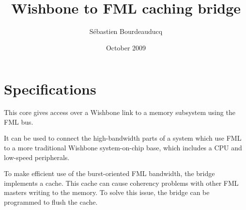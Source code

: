 \documentclass[a4paper,11pt]{article}
\title{Wishbone to FML caching bridge}
\author{S\'ebastien Bourdeauducq}
\date{October 2009}
\begin{document}
\setlength{\parindent}{0pt}
\setlength{\parskip}{5pt}
\maketitle{}
\section{Specifications}
This core gives access over a Wishbone link to a memory subsystem using the FML bus.

It can be used to connect the high-bandwidth parts of a system which use FML to a more traditional Wishbone system-on-chip base, which includes a CPU and low-speed peripherals.

To make efficient use of the burst-oriented FML bandwidth, the bridge implements a cache. This cache can cause coherency problems with other FML masters writing to the memory. To solve this issue, the bridge can be programmed to flush the cache.
\end{document}
